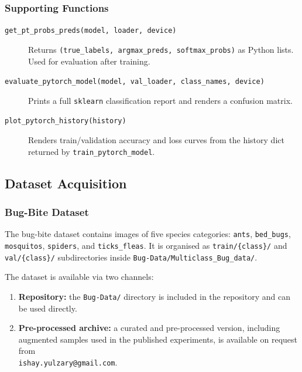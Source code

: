 \documentclass[12pt,a4paper]{article}
\begin{document}
\subsubsection{Supporting Functions}

\begin{description}
    \item[\texttt{get\_pt\_probs\_preds(model, loader, device)}]
          Returns \texttt{(true\_labels, argmax\_preds, softmax\_probs)} as
          Python lists. Used for evaluation after training.
    \item[\texttt{evaluate\_pytorch\_model(model, val\_loader, class\_names, device)}]
          Prints a full \texttt{sklearn} classification report and renders a
          confusion matrix.
    \item[\texttt{plot\_pytorch\_history(history)}]
          Renders train/validation accuracy and loss curves from the history
          dict returned by \texttt{train\_pytorch\_model}.
\end{description}

\subsection{Dataset Acquisition}
\label{sec:pg-data}

\subsubsection{Bug-Bite Dataset}
\label{sec:pg-data-bug}

The bug-bite dataset contains images of five species categories:
\texttt{ants}, \texttt{bed\_bugs}, \texttt{mosquitos}, \texttt{spiders},
and \texttt{ticks\_fleas}.
It is organised as \texttt{train/\{class\}/} and \texttt{val/\{class\}/}
subdirectories inside \texttt{Bug-Data/Multiclass\_Bug\_data/}.

The dataset is available via two channels:
\begin{enumerate}
    \item \textbf{Repository:} the \texttt{Bug-Data/} directory is included in
          the repository and can be used directly.
    \item \textbf{Pre-processed archive:} a curated and pre-processed version,
          including augmented samples used in the published experiments, is
          available on request from\\\texttt{ishay.yulzary@gmail.com}.
\end{enumerate}
\end{document}
